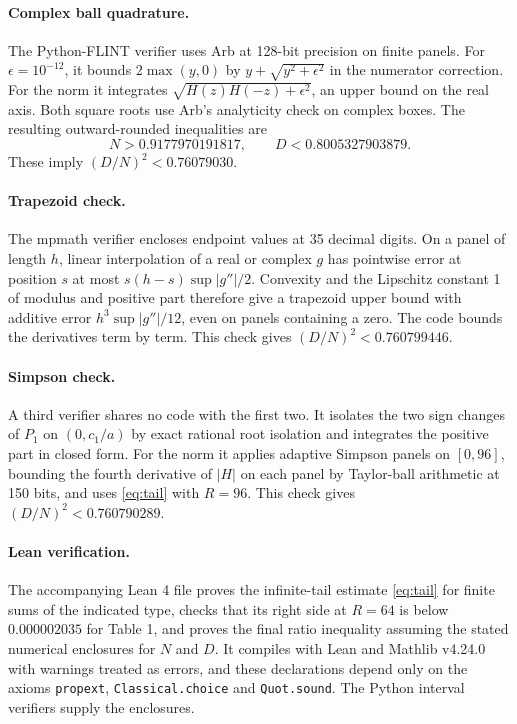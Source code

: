 \documentclass[11pt]{article}
\begin{document}
\paragraph{Complex ball quadrature.}
The Python-FLINT verifier uses Arb at 128-bit precision on finite panels.
For $\epsilon=10^{-12}$, it bounds $2\max(y,0)$ by
$y+\sqrt{y^2+\epsilon^2}$ in the numerator correction. For the norm it
integrates $\sqrt{H(z)H(-z)+\epsilon^2}$, an upper bound on the real
axis. Both square roots use Arb's analyticity check on complex boxes.
The resulting outward-rounded inequalities are
\[
 N>0.9177970191817,\qquad D<0.8005327903879 .
\]
These imply $(D/N)^2<0.76079030$.

\paragraph{Trapezoid check.}
The mpmath verifier encloses endpoint values at 35 decimal digits. On a
panel of length $h$, linear interpolation of a real or complex $g$ has
pointwise error at position $s$ at most $s(h-s)\sup|g''|/2$.
Convexity and the Lipschitz constant 1 of modulus and positive part
therefore give a trapezoid upper bound with additive error
$h^3\sup|g''|/12$, even on panels containing a zero. The code bounds
the derivatives term by term. This check gives $(D/N)^2<0.760799446$.

\paragraph{Simpson check.}
A third verifier shares no code with the first two. It isolates the two
sign changes of $P_1$ on $(0,c_1/a)$ by exact rational root isolation and
integrates the positive part in closed form. For the norm it applies
adaptive Simpson panels on $[0,96]$, bounding the fourth derivative of
$|H|$ on each panel by Taylor-ball arithmetic at 150 bits, and uses
\eqref{eq:tail} with $R=96$. This check gives $(D/N)^2<0.760790289$.

\paragraph{Lean verification.}
The accompanying Lean 4 file proves the infinite-tail estimate
\eqref{eq:tail} for finite sums of the indicated type, checks that its right side at $R=64$
is below $0.000002035$ for Table 1, and proves the final
ratio inequality assuming the stated numerical enclosures for $N$ and $D$.
It compiles with Lean and Mathlib v4.24.0 with warnings treated as errors,
and these declarations depend only on the axioms \texttt{propext},
\texttt{Classical.choice} and \texttt{Quot.sound}.
The Python interval verifiers supply the enclosures.
\end{document}
